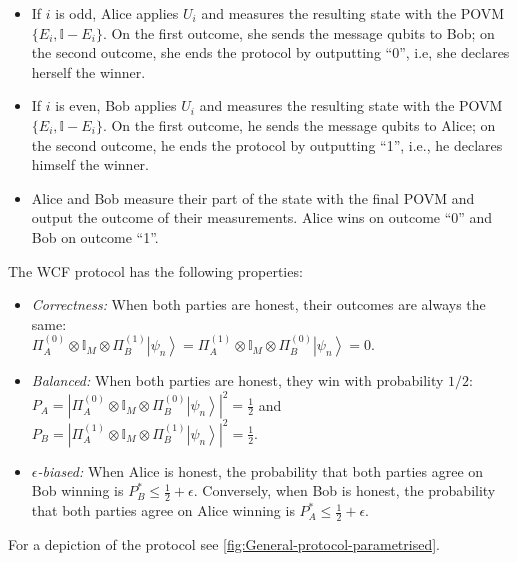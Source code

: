 \documentclass{article}
\begin{document}
\begin{definition}
\begin{itemize}
          \begin{itemize}
            \item If $i$ is odd, Alice applies $U_{i}$ and measures the resulting
                  state with the POVM $\{E_{i},\mathbb{I}-E_{i}\}$. On the first outcome,
                  she sends the message qubits to Bob; on the second outcome, she
                  ends the protocol by outputting ``0'', i.e, she declares herself
                  the winner.
            \item If $i$ is even, Bob applies $U_{i}$ and measures the resulting state
                  with the POVM $\{E_{i},\mathbb{I}-E_{i}\}$. On the first outcome,
                  he sends the message qubits to Alice; on the second outcome, he ends
                  the protocol by outputting ``1'', i.e., he declares himself the winner.
            \item Alice and Bob measure their part of the state with the final POVM
                  and output the outcome of their measurements. Alice wins on outcome
                  ``0'' and Bob on outcome ``1''.
          \end{itemize}
  \end{itemize}
  The WCF protocol has the following properties:
  \begin{itemize}
    \item \emph{Correctness:} When both parties are honest, their outcomes
          are always the same: \\
          $\Pi_{A}^{(0)}\otimes\mathbb{I}_{M}\otimes\Pi_{B}^{(1)}\left|\psi_{n}\right\rangle =\Pi_{A}^{(1)}\otimes\mathbb{I}_{M}\otimes\Pi_{B}^{(0)}\left|\psi_{n}\right\rangle =0$.
    \item \emph{Balanced:} When both parties are honest, they win with probability
          $1/2$: \\
          $P_{A}=\left|\Pi_{A}^{(0)}\otimes\mathbb{I}_{M}\otimes\Pi_{B}^{(0)}\left|\psi_{n}\right\rangle \right|^{2}=\frac{1}{2}$
          and $P_{B}=\left|\Pi_{A}^{(1)}\otimes\mathbb{I}_{M}\otimes\Pi_{B}^{(1)}\left|\psi_{n}\right\rangle \right|^{2}=\frac{1}{2}.$
    \item \emph{$\epsilon$-biased:} When Alice is honest, the probability that both
          parties agree on Bob winning is $P_{B}^{*}\le\frac{1}{2}+\epsilon$.
          Conversely, when Bob is honest, the probability that both parties
          agree on Alice winning is $P_{A}^{*}\le\frac{1}{2}+\epsilon$.
  \end{itemize}
\end{definition}
For a depiction of the protocol see  \cref{fig:General-protocol-parametrised}.
\end{document}
